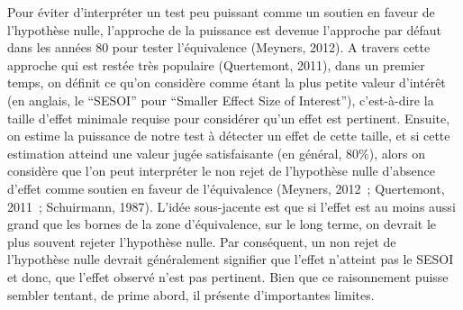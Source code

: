 \documentclass[
  12pt,
  french,
]{article}
\begin{document}
Pour éviter d'interpréter un test peu puissant comme un soutien en
faveur de l'hypothèse nulle, l'approche de la puissance est devenue
l'approche par défaut dans les années 80 pour tester l'équivalence
(Meyners, 2012). A travers cette approche qui est restée très populaire
(Quertemont, 2011), dans un premier temps, on définit ce qu'on considère
comme étant la plus petite valeur d'intérêt (en anglais, le ``SESOI''
pour ``Smaller Effect Size of Interest''), c'est-à-dire la taille
d'effet minimale requise pour considérer qu'un effet est pertinent.
Ensuite, on estime la puissance de notre test à détecter un effet de
cette
taille,
et si cette estimation atteind une valeur jugée satisfaisante (en
général, 80\%), alors on considère que l'on peut interpréter le non
rejet de l'hypothèse nulle d'absence d'effet comme soutien en faveur de
l'équivalence (Meyners, 2012~; Quertemont, 2011~; Schuirmann, 1987).
L'idée sous-jacente est que si l'effet est au moins aussi grand que les
bornes de la zone d'équivalence, sur le long terme, on devrait le plus
souvent rejeter l'hypothèse nulle. Par conséquent, un non rejet de
l'hypothèse nulle devrait généralement signifier que l'effet n'atteint
pas le SESOI et donc, que l'effet observé n'est pas pertinent. Bien que
ce raisonnement puisse sembler tentant, de prime abord, il présente
d'importantes limites.
\end{document}
